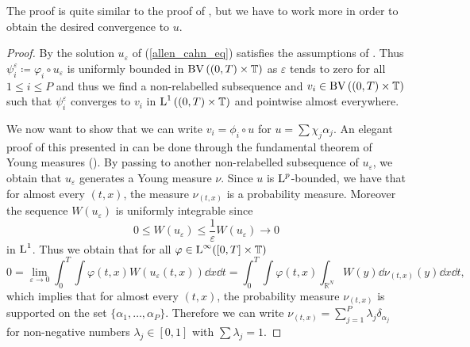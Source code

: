 \begin{remark}
	The proof is quite similar to the proof of , but we have to work more in order to obtain the desired convergence to $ u $.
\end{remark}

\begin{proof}
	By  the solution $ u_{ \varepsilon } $ of (\ref{allen_cahn_eq}) satisfies the assumptions of .
	Thus $ \psi_{ i }^{ \varepsilon } \coloneqq \varphi_{ i } \circ u_{ \varepsilon } $ is uniformly bounded in $ \operatorname{BV} \left( ( 0 , T ) \times \operatorname{\mathbb{T}} \right) $ as $ \varepsilon $ tends to zero for all $ 1 \leq i \leq P $ and thus we find a non-relabelled subsequence and $ v_{ i } \in \operatorname{BV} \left( ( 0 , T ) \times \operatorname{\mathbb{T}} \right) $ such that $ \psi_{ i }^{ \varepsilon } $ converges to $ v_{ i } $ in $ \operatorname{L}^{ 1 } \left( ( 0 , T ) \times \operatorname{\mathbb{T}} \right) $ and pointwise almost everywhere. 
	
	We now want to show that we can write $ v_{ i } = \phi_{ i } \circ u $ for $ u = \sum \chi_{ j } \alpha_{ j } $. An elegant proof of this presented in \cite[Thm.~4.1]{fonseca_tartar_1989} can be done through the fundamental theorem of Young measures (\cite[Thm.~3.1]{Müller1999}). By passing to another non-relabelled subsequence of $ u_{ \varepsilon } $, we obtain that $ u_{ \varepsilon } $ generates a Young measure $ \nu $. Since $ u $ is $ \operatorname{L}^{ p } $-bounded, we have that for almost every $ (t, x ) $, the measure $ \nu_{ ( t, x ) } $ is a probability measure. Moreover the sequence $ W ( u_{ \varepsilon } ) $ is uniformly integrable since 
	\begin{equation*}
	 	0 \leq W ( u_{ \varepsilon } ) \leq \frac{ 1 }{ \varepsilon } W ( u_{ \varepsilon } ) \to 0 
	 \end{equation*}
 	in $ \operatorname{L}^{ 1 } $. Thus we obtain that for all $ \varphi \in \operatorname{L}^{ \infty } ( [ 0 , T ] \times \operatorname{\mathbb{T}} ) $
 	\begin{equation*}
 		0
 		=
 		\lim_{ \varepsilon \to 0 }
 			\int_{ 0 }^{ T }
 				\int
 					\varphi (t, x )
 					W ( u_{ \varepsilon } (t, x ) )
 				\dd{ x }
 			\dd{ t }
 		=
 		\int_{ 0 }^{ T }
 			\int
 				\varphi ( t, x ) 
				\int_{ \mathbb{ R }^{ N } }
					W ( y )
				\dd{ \nu_{ ( t, x ) } ( y ) }
 			\dd{ x }
 		\dd{ t },
 	\end{equation*}
 	which implies that for almost every $ ( t, x ) $, the probability measure $ \nu_{ ( t, x ) } $ is supported on the set $ \{ \alpha_{ 1 } , \dotsc, \alpha_{ P } \} $. Therefore we can write
 	$ \nu_{ ( t , x ) } = \sum_{ j = 1 }^{ P } \lambda_{ j } \delta_{ \alpha_{ j } } $ for non-negative numbers $ \lambda_{ j } \in [0 ,1 ] $ with $ \sum \lambda_{ j } = 1 $.
 	

\end{proof}
